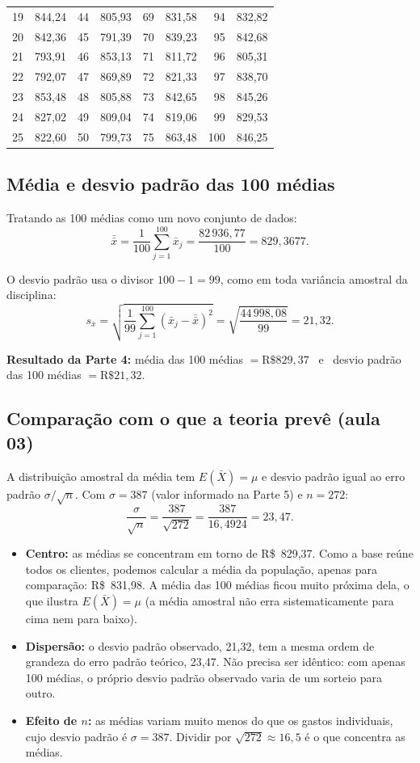 \documentclass[12pt,a4paper]{article}
\begin{document}
\begin{center}
\begin{tabular}{rr|rr|rr|rr}
19 & 844,24 & 44 & 805,93 & 69 & 831,58 & 94 & 832,82 \\
20 & 842,36 & 45 & 791,39 & 70 & 839,23 & 95 & 842,68 \\
21 & 793,91 & 46 & 853,13 & 71 & 811,72 & 96 & 805,31 \\
22 & 792,07 & 47 & 869,89 & 72 & 821,33 & 97 & 838,70 \\
23 & 853,48 & 48 & 805,88 & 73 & 842,65 & 98 & 845,26 \\
24 & 827,02 & 49 & 809,04 & 74 & 819,06 & 99 & 829,53 \\
25 & 822,60 & 50 & 799,73 & 75 & 863,48 & 100 & 846,25 \\
\bottomrule
\end{tabular}
\end{center}

\subsection*{Média e desvio padrão das 100 médias}

Tratando as 100 médias como um novo conjunto de dados:
$$\bar{\bar{x}} = \frac{1}{100}\sum_{j=1}^{100}\bar{x}_j = \frac{82\,936{,}77}{100} = 829{,}3677.$$

O desvio padrão usa o divisor $100-1 = 99$, como em toda variância amostral da disciplina:
$$s_{\bar{x}} = \sqrt{\frac{1}{99}\sum_{j=1}^{100}\left(\bar{x}_j - \bar{\bar{x}}\right)^2} = \sqrt{\frac{44\,998{,}08}{99}} = 21{,}32.$$

\textbf{Resultado da Parte 4:} média das 100 médias $= \text{R\$ } 829{,}37$ \ e \ desvio padrão das 100 médias $= \text{R\$ } 21{,}32$.

\subsection*{Comparação com o que a teoria prevê (aula 03)}

A distribuição amostral da média tem $E(\bar{X}) = \mu$ e desvio padrão igual ao erro padrão $\sigma/\sqrt{n}$. Com $\sigma = 387$ (valor informado na Parte 5) e $n = 272$:
$$\frac{\sigma}{\sqrt{n}} = \frac{387}{\sqrt{272}} = \frac{387}{16{,}4924} = 23{,}47.$$

\begin{itemize}[leftmargin=1.5em]
\item \textbf{Centro:} as médias se concentram em torno de R\$~829,37. Como a base reúne todos os clientes, podemos calcular a média da população, apenas para comparação: R\$~831,98. A média das 100 médias ficou muito próxima dela, o que ilustra $E(\bar{X}) = \mu$ (a média amostral não erra sistematicamente para cima nem para baixo).
\item \textbf{Dispersão:} o desvio padrão observado, 21,32, tem a mesma ordem de grandeza do erro padrão teórico, 23,47. Não precisa ser idêntico: com apenas 100 médias, o próprio desvio padrão observado varia de um sorteio para outro.
\item \textbf{Efeito de $n$:} as médias variam muito menos do que os gastos individuais, cujo desvio padrão é $\sigma = 387$. Dividir por $\sqrt{272} \approx 16{,}5$ é o que concentra as médias.
\end{itemize}
\end{document}
